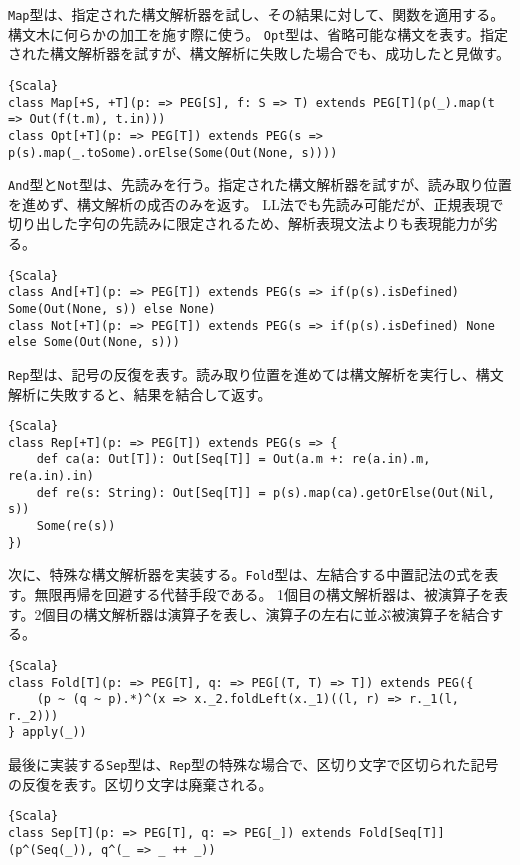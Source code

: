 \documentclass[10pt,a4paper]{book}
\begin{document}
\texttt{Map}型は、指定された構文解析器を試し、その結果に対して、関数を適用する。構文木に何らかの加工を施す際に使う。
\texttt{Opt}型は、省略可能な構文を表す。指定された構文解析器を試すが、構文解析に失敗した場合でも、成功したと見做す。

\begin{Verbatim}{Scala}
class Map[+S, +T](p: => PEG[S], f: S => T) extends PEG[T](p(_).map(t => Out(f(t.m), t.in)))
class Opt[+T](p: => PEG[T]) extends PEG(s => p(s).map(_.toSome).orElse(Some(Out(None, s))))
\end{Verbatim}

\texttt{And}型と\texttt{Not}型は、先読みを行う。指定された構文解析器を試すが、読み取り位置を進めず、構文解析の成否のみを返す。
LL法でも先読み可能だが、正規表現で切り出した字句の先読みに限定されるため、解析表現文法よりも表現能力が劣る。

\begin{Verbatim}{Scala}
class And[+T](p: => PEG[T]) extends PEG(s => if(p(s).isDefined) Some(Out(None, s)) else None)
class Not[+T](p: => PEG[T]) extends PEG(s => if(p(s).isDefined) None else Some(Out(None, s)))
\end{Verbatim}

\texttt{Rep}型は、記号の反復を表す。読み取り位置を進めては構文解析を実行し、構文解析に失敗すると、結果を結合して返す。

\begin{Verbatim}{Scala}
class Rep[+T](p: => PEG[T]) extends PEG(s => {
	def ca(a: Out[T]): Out[Seq[T]] = Out(a.m +: re(a.in).m, re(a.in).in)
	def re(s: String): Out[Seq[T]] = p(s).map(ca).getOrElse(Out(Nil, s))
	Some(re(s))
})
\end{Verbatim}

次に、特殊な構文解析器を実装する。\texttt{Fold}型は、左結合する中置記法の式を表す。無限再帰を回避する代替手段である。
1個目の構文解析器は、被演算子を表す。2個目の構文解析器は演算子を表し、演算子の左右に並ぶ被演算子を結合する。

\begin{Verbatim}{Scala}
class Fold[T](p: => PEG[T], q: => PEG[(T, T) => T]) extends PEG({
	(p ~ (q ~ p).*)^(x => x._2.foldLeft(x._1)((l, r) => r._1(l, r._2)))
} apply(_))
\end{Verbatim}

最後に実装する\texttt{Sep}型は、\texttt{Rep}型の特殊な場合で、区切り文字で区切られた記号の反復を表す。区切り文字は廃棄される。

\begin{Verbatim}{Scala}
class Sep[T](p: => PEG[T], q: => PEG[_]) extends Fold[Seq[T]](p^(Seq(_)), q^(_ => _ ++ _))
\end{Verbatim}
\end{document}
